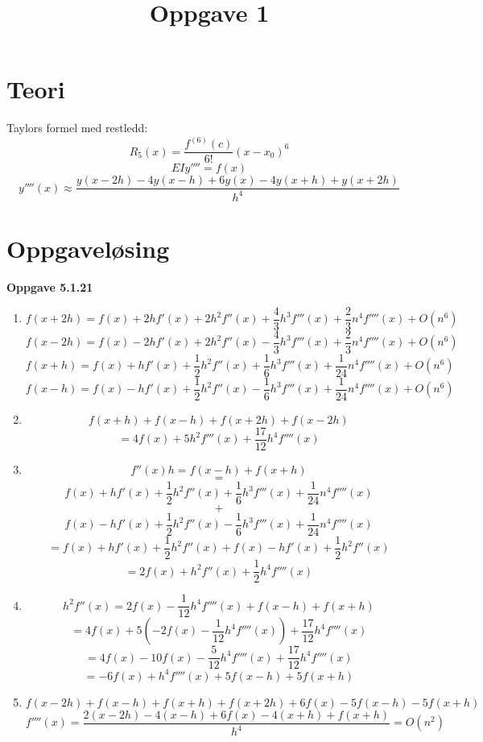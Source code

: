\documentclass[11pt]{article}
\title{Oppgave 1}
\begin{document}
        \section{Teori}
        Taylors formel med restledd:
        \[R_5(x)= \frac{f^{(6)}(c)} {6!}(x-x_0)^6\]
        \[EIy''''=f(x)\]
        \[y''''(x) \approx \frac{y(x - 2h)-4y(x - h)+ 6y(x) - 4y(x + h) + y(x + 2h)}{h^4}\]
        \section{Oppgaveløsing}
    
    \textbf{Oppgave 5.1.21}
    \begin{enumerate}

        \item \[f(x + 2h) = f(x) + 2hf'(x) + 2h^2f''(x) + \frac{4}{3}h^3f'''(x)+ \frac{2}{3}n^4f''''(x) +O(n^6)\]
         \[f(x - 2h) = f(x) - 2hf'(x) + 2h^2f''(x) - \frac{4}{3}h^3f'''(x)+ \frac{2}{3}n^4f''''(x) +O(n^6)\]
         \[f(x + h) = f(x) + hf'(x) + \frac{1}{2}h^2f''(x) + \frac{1}{6}h^3f'''(x)+ \frac{1}{24}n^4f''''(x) +O(n^6)\]
         \[f(x - h) = f(x) - hf'(x) + \frac{1}{2}h^2f''(x) - \frac{1}{6}h^3f'''(x)+ \frac{1}{24}n^4f''''(x) +O(n^6)\]
        \item \[f(x + h) + f(x - h) + f(x + 2h) + f(x - 2h)\]
        \[= 4f(x) + 5h^2f'''(x) + \frac{17}{12}h^4f''''(x)\]
        \item \[f''(x)h = f(x - h) + f(x + h)\]
        \[=\]
        \[f(x) + hf'(x) + \frac{1}{2}h^2f''(x) + \frac{1}{6}h^3f'''(x)+ \frac{1}{24}n^4f''''(x)\]
        \[+\]
        \[f(x) - hf'(x) + \frac{1}{2}h^2f''(x) - \frac{1}{6}h^3f'''(x)+ \frac{1}{24}n^4f''''(x)\]
        \[= f(x) + hf'(x) + \frac{1}{2}h^2f''(x) + f(x) - hf'(x) + \frac{1}{2}h^2f''(x)\]
        \[= 2f(x) + h^2f''(x) + \frac{1}{2}h^4f''''(x)\]
        \item
        \[h^2f''(x) = 2f(x) - \frac{1}{12}h^4f''''(x) + f(x - h) + f(x + h)\]
        \[= 4f(x) + 5(-2f(x)-\frac{1}{12} h^4f''''(x)) + \frac{17}{12}h^4f''''(x)\]
        \[= 4f(x) - 10f(x) - \frac{5}{12}h^4f''''(x) + \frac{17}{12}h^4f''''(x)\]
        \[= -6f(x) + h^4f''''(x) + 5f(x - h) + 5f(x + h)\]
        \item \[f(x - 2h) + f(x - h) + f(x + h) + f(x + 2h) + 6f(x) - 5f(x - h) - 5f(x + h)\]
        \[f''''(x) = \frac{2(x-2h) - 4(x-h) + 6f(x) - 4(x+h) + f(x+h)} {h^4} = O(n^2)\]
        
    \end{enumerate}
\end{document}
